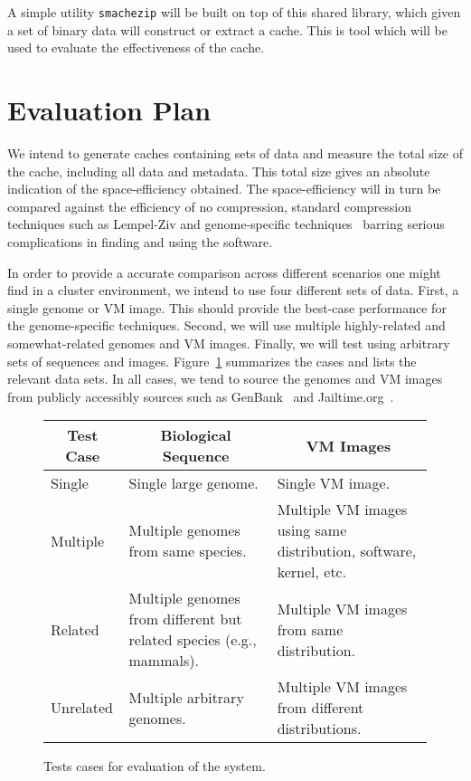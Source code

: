 \documentclass{article}[12pt]
\begin{document}
A simple utility {\tt smachezip} will be built on top of this shared library,
which given a set of binary data will construct or extract a cache.  This is
tool which will be used to evaluate the effectiveness of the cache.

\section*{Evaluation Plan}

We intend to generate caches containing sets of data and measure the total size
of the cache, including all data and metadata.  This total size gives an
absolute indication of the space-efficiency obtained.  The space-efficiency
will in turn be compared against the efficiency of no compression, standard
compression techniques such as Lempel-Ziv and genome-specific
techniques~\cite{statistical} barring serious complications in finding and
using the software.

In order to provide a accurate comparison across different scenarios one might
find in a cluster environment, we intend to use four different sets of data.
First, a single genome or VM image.  This should provide the best-case
performance for the genome-specific techniques.  Second, we will use multiple
highly-related and somewhat-related genomes and VM images.  Finally, we will
test using arbitrary sets of sequences and images.  Figure~\ref{fig:cases}
summarizes the cases and lists the relevant data sets.  In all cases, we tend
to source the genomes and VM images from publicly accessibly sources such as
GenBank~\cite{genbank} and Jailtime.org~\cite{jailtime}.

\begin{figure}
\begin{center}
\begin{tabular}{|l|l|l|}
\hline
\multicolumn{1}{|c}{Test Case} & \multicolumn{1}{|c|}{Biological Sequence} & \multicolumn{1}{c|}{VM Images} \\
\hline
Single       & Single large genome. & Single VM image. \\
\hline
Multiple     & \parbox{2in}{Multiple genomes from same species.} & \parbox{2in}{Multiple VM images using same distribution, software, kernel, etc.} \\
\hline
Related      & \parbox{2in}{Multiple genomes from different but related species (e.g., mammals).} & \parbox{2in}{Multiple VM images from same distribution.} \\
\hline
Unrelated    & \parbox{2in}{Multiple arbitrary genomes.} & \parbox{2in}{Multiple VM images from different distributions.} \\
\hline
\end{tabular}
\end{center}
\caption{Tests cases for evaluation of the system.}
\label{fig:cases}
\end{figure}
\end{document}
